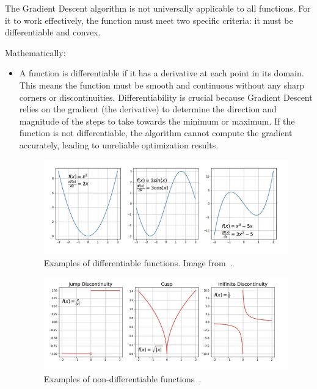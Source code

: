 \documentclass[12pt,a4paper]{report}
\begin{document}
The Gradient Descent algorithm is not universally applicable to all functions. For it to work effectively, the function must meet two specific criteria: it must be differentiable and convex.

Mathematically:
\begin{itemize}
  \item A function is differentiable if it has a derivative at each point in its domain. This means the function must be smooth and continuous without any sharp corners or discontinuities. Differentiability is crucial because Gradient Descent relies on the gradient (the derivative) to determine the direction and magnitude of the steps to take towards the minimum or maximum. If the function is not differentiable, the algorithm cannot compute the gradient accurately, leading to unreliable optimization results.
        \begin{figure}[th]
          \centering
          \includegraphics[scale=0.637]{./pics/diff_func.png}
          \caption[Examples of differentiable functions]{Examples of differentiable functions. Image from~\cite{gradientdescent}.}
          \label{fig:pic1}
        \end{figure}
        \begin{figure}[th]
          \centering
          \includegraphics[scale=0.637]{./pics/undiff_func.png}
          \caption[Examples of non-differentiable functions]{Examples of non-differentiable functions~\cite{gradientdescent}.}
          \label{fig:pic2}
        \end{figure}

\end{itemize}
\end{document}
